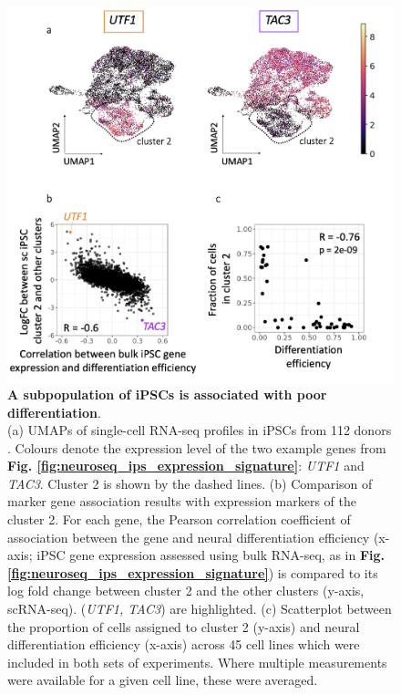\begin{figure}[htbp]
\centering
\includegraphics[width=14cm]{Chapter5/Fig/neuroseq_ips_sc_genes.png}
\caption[An iPSC subpopulation is linked to poor differentiation]{\textbf{A subpopulation of iPSCs is associated with poor differentiation}.\\
(a) UMAPs of single-cell RNA-seq profiles in iPSCs from 112 donors \cite{cuomo2020single}.
Colours denote the expression level of the two example genes from \textbf{Fig. \ref{fig:neuroseq_ips_expression_signature}}: \textit{UTF1} and \textit{TAC3}. 
Cluster 2 is shown by the dashed lines. 
(b) Comparison of marker gene association results with expression markers of the cluster 2. For each gene, the Pearson correlation coefficient of association between the gene and neural differentiation efficiency (x-axis; iPSC gene expression assessed using bulk RNA-seq, as in \textbf{Fig. \ref{fig:neuroseq_ips_expression_signature}}) is compared to its log fold change between cluster 2 and the other clusters (y-axis, scRNA-seq).
(\textit{UTF1, TAC3}) are highlighted. 
(c) Scatterplot between the proportion of cells assigned to cluster 2 (y-axis) and neural differentiation efficiency (x-axis) across 45 cell lines which were included in both sets of experiments. 
Where multiple measurements were available for a given cell line, these were averaged.}
\label{fig:neuroseq_ips_sc_genes}
\end{figure}


